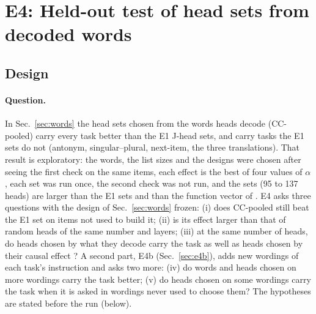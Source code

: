 \documentclass[11pt,a4paper]{article}
\begin{document}
\begin{table}[H]
\centering\footnotesize\setlength{\tabcolsep}{4pt}

\caption{As Table~\ref{tab:words}, with the control mean, at the $\alpha$ of the highest task-mean accuracy.}
\label{tab:words-control}
\end{table}

\section{E4: Held-out test of head sets from decoded words}
\label{sec:e4}

\subsection{Design}

\paragraph{Question.} In Sec.~\ref{sec:words} the head sets chosen from the words heads decode
(CC-pooled) carry every task better than the E1 J-head sets, and carry tasks the E1 sets do
not (antonym, singular--plural, next-item, the three translations). That result is exploratory:
the words, the list sizes and the designs were chosen after seeing the first check on the same
items, each effect is the best of four values of $\alpha$, each set was run once, the second check
was not run, and the sets (95 to 137 heads) are larger than the E1 sets and than the function
vector of \citet{davidson2025different}. E4 asks three questions with the design of Sec.~\ref{sec:words} frozen:
(i) does CC-pooled still beat the E1 set on items not used to build it; (ii) is its effect larger
than that of random heads of the same number and layers; (iii) at the same number of heads, do
heads chosen by what they decode carry the task as well as heads chosen by their causal effect
\citep{davidson2025different}? A second part, E4b (Sec.~\ref{sec:e4b}), adds new wordings of
each task's instruction and asks two more: (iv) do words and heads chosen on more wordings
carry the task better; (v) do heads chosen on some wordings carry the task when it is asked in
wordings never used to choose them? The hypotheses are stated before the run (below).
\end{document}
